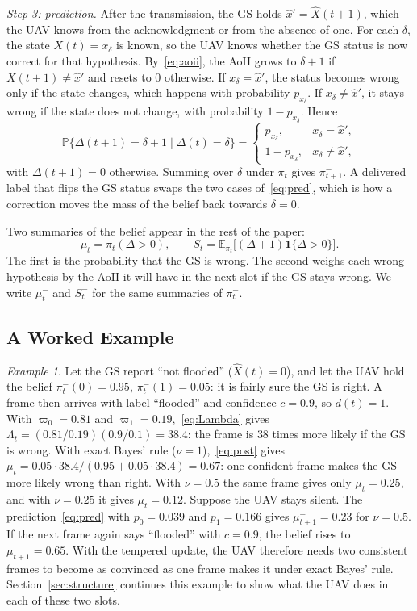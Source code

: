\documentclass[journal]{IEEEtran}
\theoremstyle{remark}
\newtheorem{example}{Example}
\newcommand{\E}{\mathbb{E}}
\newcommand{\Prob}{\mathbb{P}}
\newcommand{\ind}[1]{\mathbf{1}\{#1\}}
\newcommand{\xh}{\hat{x}}
\begin{document}
\emph{Step 3: prediction.} After the transmission, the GS holds $\xh'=\hat X(t+1)$, which the UAV knows from the acknowledgment or from the absence of one. For each $\delta$, the state $X(t)=x_\delta$ is known, so the UAV knows whether the GS status is now correct for that hypothesis. By~\eqref{eq:aoii}, the AoII grows to $\delta+1$ if $X(t+1)\neq\xh'$ and resets to 0 otherwise. If $x_\delta=\xh'$, the status becomes wrong only if the state changes, which happens with probability $p_{x_\delta}$. If $x_\delta\neq\xh'$, it stays wrong if the state does not change, with probability $1-p_{x_\delta}$. Hence
\begin{equation}\label{eq:pred}
\Prob\big\{\Delta(t+1)=\delta+1\mid\Delta(t)=\delta\big\}=\begin{cases}p_{x_\delta}, & x_\delta=\xh',\\ 1-p_{x_\delta}, & x_\delta\neq\xh',\end{cases}
\end{equation}
with $\Delta(t+1)=0$ otherwise. Summing over $\delta$ under $\pi_t$ gives $\pi^-_{t+1}$. A delivered label that flips the GS status swaps the two cases of~\eqref{eq:pred}, which is how a correction moves the mass of the belief back towards $\delta=0$.

Two summaries of the belief appear in the rest of the paper:
\begin{equation}\label{eq:musum}
\mu_t=\pi_t(\Delta>0),\qquad S_t=\E_{\pi_t}\big[(\Delta+1)\ind{\Delta>0}\big].
\end{equation}
The first is the probability that the GS is wrong. The second weighs each wrong hypothesis by the AoII it will have in the next slot if the GS stays wrong. We write $\mu^-_t$ and $S^-_t$ for the same summaries of $\pi^-_t$.

\subsection{A Worked Example}
\begin{example}\label{ex:belief}
Let the GS report ``not flooded'' ($\hat X(t)=0$), and let the UAV hold the belief $\pi^-_t(0)=0.95$, $\pi^-_t(1)=0.05$: it is fairly sure the GS is right. A frame then arrives with label ``flooded'' and confidence $c=0.9$, so $d(t)=1$. With $\varpi_0=0.81$ and $\varpi_1=0.19$,~\eqref{eq:Lambda} gives $\Lambda_t=(0.81/0.19)(0.9/0.1)=38.4$: the frame is $38$ times more likely if the GS is wrong. With exact Bayes' rule ($\nu=1$),~\eqref{eq:post} gives $\mu_t=0.05\cdot38.4/(0.95+0.05\cdot38.4)=0.67$: one confident frame makes the GS more likely wrong than right. With $\nu=0.5$ the same frame gives only $\mu_t=0.25$, and with $\nu=0.25$ it gives $\mu_t=0.12$. Suppose the UAV stays silent. The prediction~\eqref{eq:pred} with $p_0=0.039$ and $p_1=0.166$ gives $\mu^-_{t+1}=0.23$ for $\nu=0.5$. If the next frame again says ``flooded'' with $c=0.9$, the belief rises to $\mu_{t+1}=0.65$. With the tempered update, the UAV therefore needs two consistent frames to become as convinced as one frame makes it under exact Bayes' rule. Section~\ref{sec:structure} continues this example to show what the UAV does in each of these two slots.
\end{example}
\end{document}
